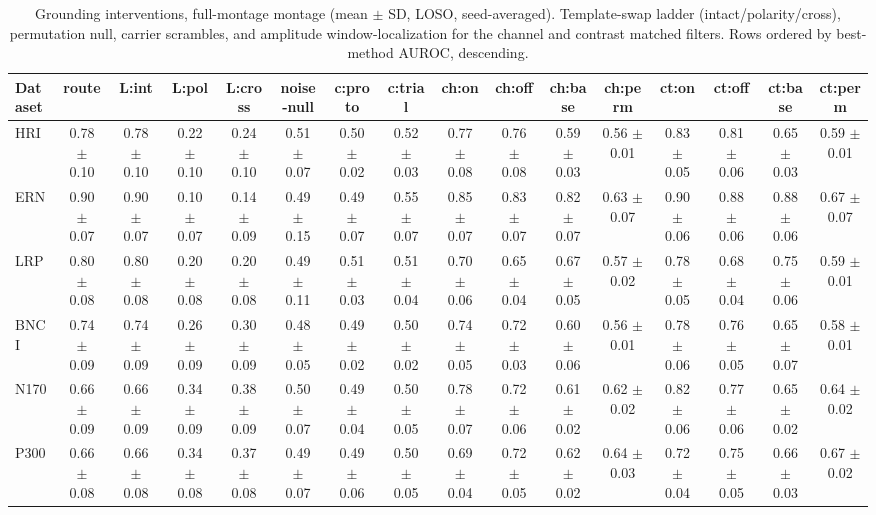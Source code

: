 \begin{table}[t]
\centering
\setlength{\tabcolsep}{3pt}
\caption{Grounding interventions, full-montage montage (mean $\pm$ SD, LOSO, seed-averaged). Template-swap ladder (intact/polarity/cross), permutation null, carrier scrambles, and amplitude window-localization for the channel and contrast matched filters. Rows ordered by best-method AUROC, descending.}
\label{sup:tab-grounding-full}
\begin{tabular}{lccccccccccccccc}
\toprule
Dataset & route & L:int & L:pol & L:cross & noise-null & c:proto & c:trial & ch:on & ch:off & ch:base & ch:perm & ct:on & ct:off & ct:base & ct:perm \\
\midrule
HRI & 0.78 $\pm$ 0.10 & 0.78 $\pm$ 0.10 & 0.22 $\pm$ 0.10 & 0.24 $\pm$ 0.10 & 0.51 $\pm$ 0.07 & 0.50 $\pm$ 0.02 & 0.52 $\pm$ 0.03 & 0.77 $\pm$ 0.08 & 0.76 $\pm$ 0.08 & 0.59 $\pm$ 0.03 & 0.56 $\pm$ 0.01 & 0.83 $\pm$ 0.05 & 0.81 $\pm$ 0.06 & 0.65 $\pm$ 0.03 & 0.59 $\pm$ 0.01 \\
ERN & 0.90 $\pm$ 0.07 & 0.90 $\pm$ 0.07 & 0.10 $\pm$ 0.07 & 0.14 $\pm$ 0.09 & 0.49 $\pm$ 0.15 & 0.49 $\pm$ 0.07 & 0.55 $\pm$ 0.07 & 0.85 $\pm$ 0.07 & 0.83 $\pm$ 0.07 & 0.82 $\pm$ 0.07 & 0.63 $\pm$ 0.07 & 0.90 $\pm$ 0.06 & 0.88 $\pm$ 0.06 & 0.88 $\pm$ 0.06 & 0.67 $\pm$ 0.07 \\
LRP & 0.80 $\pm$ 0.08 & 0.80 $\pm$ 0.08 & 0.20 $\pm$ 0.08 & 0.20 $\pm$ 0.08 & 0.49 $\pm$ 0.11 & 0.51 $\pm$ 0.03 & 0.51 $\pm$ 0.04 & 0.70 $\pm$ 0.06 & 0.65 $\pm$ 0.04 & 0.67 $\pm$ 0.05 & 0.57 $\pm$ 0.02 & 0.78 $\pm$ 0.05 & 0.68 $\pm$ 0.04 & 0.75 $\pm$ 0.06 & 0.59 $\pm$ 0.01 \\
BNCI & 0.74 $\pm$ 0.09 & 0.74 $\pm$ 0.09 & 0.26 $\pm$ 0.09 & 0.30 $\pm$ 0.09 & 0.48 $\pm$ 0.05 & 0.49 $\pm$ 0.02 & 0.50 $\pm$ 0.02 & 0.74 $\pm$ 0.05 & 0.72 $\pm$ 0.03 & 0.60 $\pm$ 0.06 & 0.56 $\pm$ 0.01 & 0.78 $\pm$ 0.06 & 0.76 $\pm$ 0.05 & 0.65 $\pm$ 0.07 & 0.58 $\pm$ 0.01 \\
N170 & 0.66 $\pm$ 0.09 & 0.66 $\pm$ 0.09 & 0.34 $\pm$ 0.09 & 0.38 $\pm$ 0.09 & 0.50 $\pm$ 0.07 & 0.49 $\pm$ 0.04 & 0.50 $\pm$ 0.05 & 0.78 $\pm$ 0.07 & 0.72 $\pm$ 0.06 & 0.61 $\pm$ 0.02 & 0.62 $\pm$ 0.02 & 0.82 $\pm$ 0.06 & 0.77 $\pm$ 0.06 & 0.65 $\pm$ 0.02 & 0.64 $\pm$ 0.02 \\
P300 & 0.66 $\pm$ 0.08 & 0.66 $\pm$ 0.08 & 0.34 $\pm$ 0.08 & 0.37 $\pm$ 0.08 & 0.49 $\pm$ 0.07 & 0.49 $\pm$ 0.06 & 0.50 $\pm$ 0.05 & 0.69 $\pm$ 0.04 & 0.72 $\pm$ 0.05 & 0.62 $\pm$ 0.02 & 0.64 $\pm$ 0.03 & 0.72 $\pm$ 0.04 & 0.75 $\pm$ 0.05 & 0.66 $\pm$ 0.03 & 0.67 $\pm$ 0.02 \\

\end{tabular}
\end{table}

